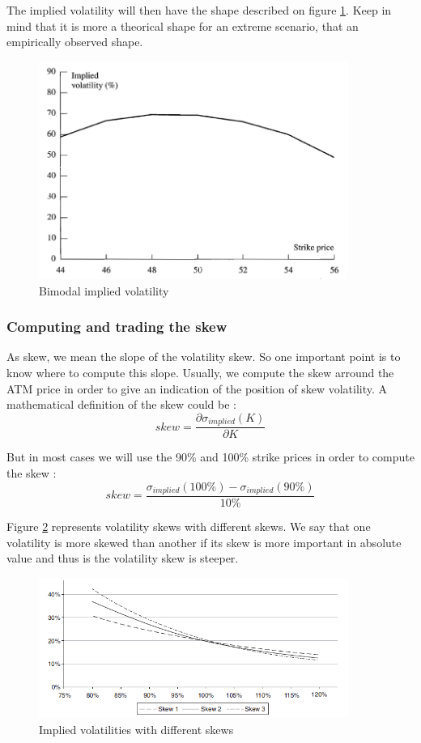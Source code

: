 \documentclass[hidelinks]{article}
\theoremstyle{definition}
\begin{document}
    The implied volatility will then have the shape described on figure \ref{fig:skew_binom}. Keep in mind that it is more a theorical shape for an extreme scenario, that an empirically observed shape.
    \begin{figure}[!h]
	\centering
	\includegraphics[width=0.9\textwidth]{skew_binom.png}
    \caption{Bimodal implied volatility}
    \label{fig:skew_binom}
    \end{figure}
   
   \subsubsection{Computing and trading the skew}
   As skew, we mean the slope of the volatility skew. So one important point is to know where to compute this slope. Usually, we compute the skew arround the ATM price in order to give an indication of the position of skew volatility. A mathematical definition of the skew could be :
   $$ skew = \frac{\partial \sigma_{implied}(K)}{\partial K}$$
   
   But in most cases we will use the 90\% and 100\% strike prices in order to compute the skew :
   $$ skew = \frac{\sigma_{implied}(100\%) - \sigma_{implied}(90\%)}{10\%} $$
   
   Figure \ref{fig:skews} represents volatility skews with different skews. We say that one volatility is more skewed than another if its skew is more important in absolute value and thus is the volatility skew is steeper.
   
   \begin{figure}[!h]
	\centering
	\includegraphics[width=0.9\textwidth]{skews.png}
    \caption{Implied volatilities with different skews}
    \label{fig:skews}
    \end{figure}
    
\end{document}
